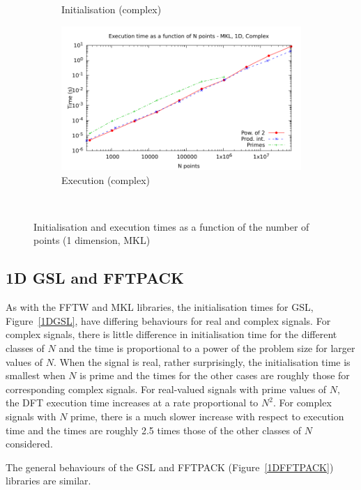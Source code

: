 \documentclass[12pt, a4paper]{article} \setlength{\textheight}{24cm}
\begin{document}
\begin{figure}[htb]
\begin{subfigure}{.5\textwidth}
    \caption{Initialisation (complex)}
    \label{1DMKLCI}
  \end{subfigure}%
  \begin{subfigure}{.5\textwidth}
    \centering
    \includegraphics[width=.9\linewidth]{graphs/1d-mkl-exec-c.pdf}
    \caption{Execution (complex)}
    \label{1DMKLC}
  \end{subfigure}\\
  \caption{Initialisation and execution times as a function of the
    number of points (1 dimension, MKL)}
  \label{1DMKL}
\end{figure}

\subsection{1D GSL and FFTPACK}\label{Sec:FFTPACK1d}
As with the FFTW and MKL libraries, the initialisation times for GSL,
Figure~\ref{1DGSL}, have differing behaviours for real and complex
signals. For complex signals, there is little difference in
initialisation time for the different classes of $N$ and the time is
proportional to a power of the problem size for larger values of
$N$. When the signal is real, rather surprisingly, the initialisation
time is smallest when $N$ is prime and the times for the other cases
are roughly those for corresponding complex signals. For real-valued
signals with prime values of $N,$ the DFT execution time increases at
a rate proportional to $N^2.$ For complex signals with $N$ prime,
there is a much slower increase with respect to execution time and the
times are roughly 2.5 times those of the other classes of $N$
considered.

The general behaviours of the GSL and FFTPACK (Figure~\ref{1DFFTPACK})
libraries are similar.
\end{document}
